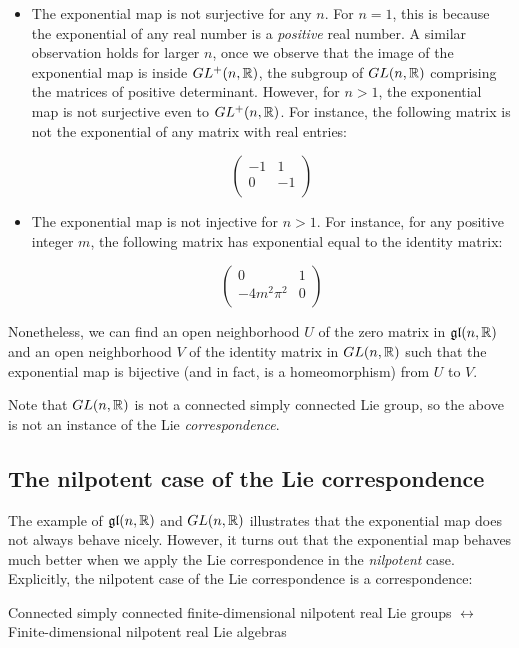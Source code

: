 \begin{itemize}
\item The exponential map is not surjective for any $n$. For $n = 1$,
  this is because the exponential of any real number is a {\em
    positive} real number. A similar observation holds for larger $n$,
  once we observe that the image of the exponential map is inside
  $GL^+(n,\mathbb{R})$, the subgroup of $GL(n,\mathbb{R})$ comprising the matrices of
  positive determinant. However, for $n > 1$, the exponential map is
  not surjective even to $GL^+(n,\mathbb{R})$. For instance, the following
  matrix is not the exponential of any matrix with real entries:

  $$\begin{pmatrix} -1 & 1 \\ 0 & -1 \\\end{pmatrix}$$

\item The exponential map is not injective for $n > 1$. For instance,
  for any positive integer $m$, the following matrix has exponential
  equal to the identity matrix:

  $$\begin{pmatrix} 0 & 1 \\ -4m^2\pi^2 & 0 \\\end{pmatrix}$$
\end{itemize}

Nonetheless, we can find an open neighborhood $U$ of the zero matrix
in $\mathfrak{g}\mathfrak{l}(n,\mathbb{R})$ and an open neighborhood $V$ of
the identity matrix in $GL(n,\mathbb{R})$ such that the exponential map is
bijective (and in fact, is a homeomorphism) from $U$ to $V$.

Note that $GL(n,\mathbb{R})$ is not a connected simply connected Lie group, so
the above is not an instance of the Lie {\em correspondence}.
\subsection{The nilpotent case of the Lie correspondence}

The example of $\mathfrak{g}\mathfrak{l}(n,\mathbb{R})$ and $GL(n,\mathbb{R})$
illustrates that the exponential map does not always behave
nicely. However, it turns out that the exponential map behaves much
better when we apply the Lie correspondence in the {\em nilpotent}
case. Explicitly, the nilpotent case of the Lie correspondence is a
correspondence:

\begin{center}
  Connected simply connected finite-dimensional nilpotent real Lie
  groups $\leftrightarrow$ Finite-dimensional nilpotent real Lie
  algebras
\end{center}


